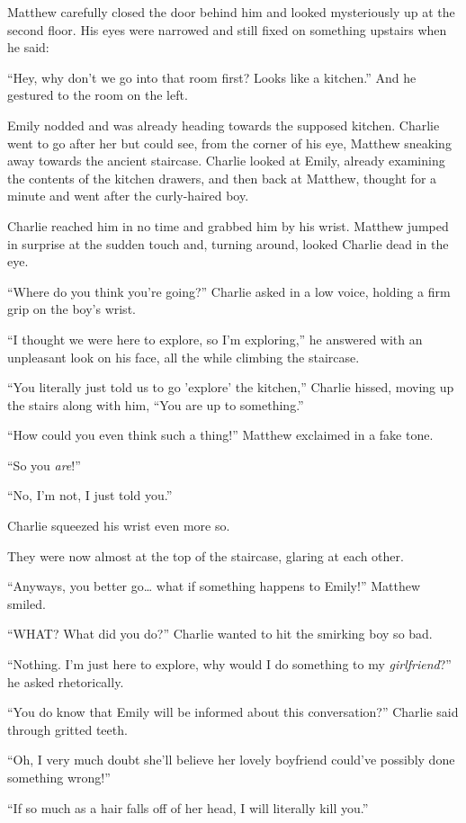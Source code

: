 Matthew carefully closed the door behind him and looked mysteriously up at the second floor. His eyes were narrowed and still fixed on something upstairs when he said:

“Hey, why don't we go into that room first? Looks like a kitchen.” And he gestured to the room on the left.

Emily nodded and was already heading towards the supposed kitchen. Charlie went to go after her but could see, from the corner of his eye, Matthew sneaking away towards the ancient staircase. Charlie looked at Emily, already examining the contents of the kitchen drawers, and then back at Matthew, thought for a minute and went after the curly-haired boy.

Charlie reached him in no time and grabbed him by his wrist. Matthew jumped in surprise at the sudden touch and, turning around, looked Charlie dead in the eye.

“Where do you think you're going?” Charlie asked in a low voice, holding a firm grip on the boy's wrist.

“I thought we were here to explore, so I'm exploring,” he answered with an unpleasant look on his face, all the while climbing the staircase.

“You literally just told us to go 'explore' the kitchen,” Charlie hissed, moving up the stairs along with him, “You are up to something.”

“How could you even think such a thing!” Matthew exclaimed in a fake tone.

“So you \textit{are}!”

“No, I'm not, I just told you.”

Charlie squeezed his wrist even more so.

They were now almost at the top of the staircase, glaring at each other.

“Anyways, you better go… what if something happens to Emily!” Matthew smiled.

“WHAT? What did you do?” Charlie wanted to hit the smirking boy so bad.

“Nothing. I'm just here to explore, why would I do something to my \textit{girlfriend}?” he asked rhetorically.

“You do know that Emily will be informed about this conversation?” Charlie said through gritted teeth.

“Oh, I very much doubt she'll believe her lovely boyfriend could've possibly done something wrong!”

“If so much as a hair falls off of her head, I will literally kill you.”

